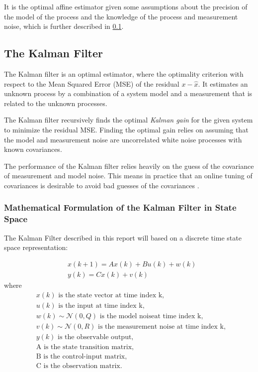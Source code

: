 It is the optimal affine estimator given some assumptions about the precision of the model of the process and the knowledge of the process and measurement noise, which is further described in \cref{sec:the_kalman_filter}.





\subsection{The Kalman Filter} \label{sec:the_kalman_filter}
The Kalman filter is an optimal estimator, where the optimality criterion with respect to the Mean Squared Error (MSE) of the residual $x-\hat{x}$.
It estimates an unknown process by a combination of a system model and a measurement that is related to the unknown processes. 

The Kalman filter recursively finds the optimal \textit{Kalman gain} for the given system to minimize the residual MSE. Finding the optimal gain relies on assuming that the model and measurement noise are uncorrelated white noise processes with known covariances. 

The performance of the Kalman filter relies heavily on the guess of the covariance of measurement and model noise. This means in practice that an online tuning of covariances is desirable to avoid bad guesses of the covariances \cite[p. 232]{Doraiswami2014}.

\subsubsection{Mathematical Formulation of the Kalman Filter in State Space}
The Kalman Filter described in this report will based on a discrete time state space representation: 

\begin{align}
	&{x}(k+1) = {A}{x}(k) + {B}{u}(k) + {w}(k)  \label{eq:KalmanSystemEquations} \\
	&{y}(k) = {C}{x}(k)+{v}(k) 
\end{align}
where 
\begin{align*}
	&\text{${x}(k)$ is the state vector at time index k,					}	\\[-1em]
	&\text{${u}(k)$ is the input at time index k, 						}	\\[-1em]
	&\text{${w}(k) \sim \mathcal{N}(0, Q)$ is the model noiseat time index k,			}	\\[-1em]
	&\text{${v}(k) \sim \mathcal{N}(0, R)$ is the measurement noise at time index k,		}	\\[-1em]
	&\text{${y}(k)$ is the observable output, 							}	\\[-1em]
	&\text{{A} is the state transition matrix,							}	\\[-1em]
	&\text{{B} is the control-input matrix,								}	\\[-1em]
	&\text{{C} is the observation matrix. 								}	\\[-1em]
\end{align*}


